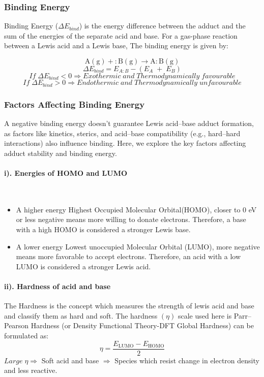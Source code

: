 \subsubsection{Binding Energy}
Binding Energy ($\Delta E_{bind}$) is the energy difference between the adduct and the sum of the energies of the separate acid and base. For a gas-phase reaction between a Lewis acid and a
Lewis base, The binding energy is given by:

\[
\mathrm{A(g)} + \mathrm{:B(g)} \rightarrow \mathrm{A{:}B(g)}
\]
\[
\Delta E_{bind} = E_{A:B} - (E_{A} \;+ \; E_{B})
\]
\[
If \; \Delta E_{bind} < 0 	\Rightarrow Exothermic \;  and \;  Thermodynamically \; favourable
\]
\[
If \; \Delta E_{bind} > 0 	\Rightarrow Endothermic \;  and \;  Thermodynamically \; unfavourable
\]


\subsubsection{Factors Affecting Binding Energy}
A negative binding energy doesn't guarantee Lewis acid–base adduct formation, as factors like kinetics, sterics, and acid–base compatibility (e.g., hard–hard interactions) also influence binding. Here, we explore the key factors affecting adduct stability and binding energy.

\paragraph{i). Energies of HOMO and LUMO}~
\begin{itemize}
    \item A higher energy Highest Occupied Molecular Orbital(HOMO), closer to 0 eV or less negative means more willing to donate electrons. Therefore, a base with a high HOMO is considered a stronger Lewis base.
    \item A lower energy Lowest unoccupied Molecular Orbital (LUMO), more negative means more favorable to accept electrons. Therefore, an acid with a low LUMO is considered a stronger Lewis acid.
\end{itemize}
\paragraph{ii). Hardness of acid and base}
The Hardness is the concept which measures the strength of lewis acid and base and classify them as hard and soft. The hardness $(\eta)$ scale used here is Parr–Pearson Hardness (or Density Functional Theory-DFT Global Hardness) can be formulated as:
\[
\eta = \frac{E_{\text{LUMO}} - E_{\text{HOMO}}}2
\]
$Large \; \eta \Rightarrow $  Soft acid and base $\Rightarrow$ Species which resist change in electron density and less reactive. 

